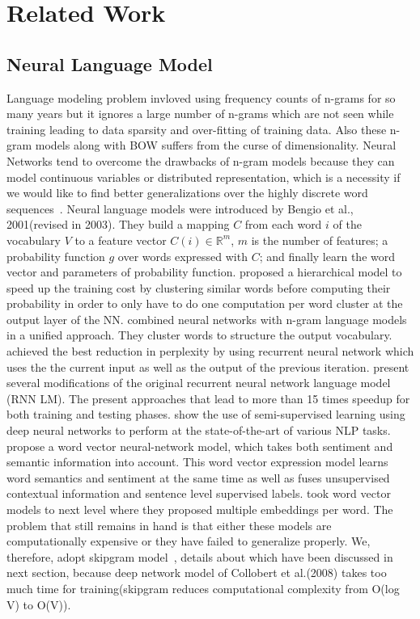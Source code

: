 \documentclass[11pt,a4paper]{article}
\begin{document}
\section{Related Work}
\subsection{Neural Language Model}
Language modeling problem invloved using frequency counts of n-grams for so many years but it ignores a large number of n-grams which are not seen while training leading to data sparsity and over-fitting of training data. Also these n-gram models along with BOW suffers from the curse of dimensionality. Neural Networks tend to overcome the drawbacks of n-gram models because they can model continuous variables or distributed representation, which is a necessity if we would like to find better generalizations over the highly discrete word sequences~\cite{Bengio:03}. 
Neural language models were introduced by Bengio et al., 2001(revised in 2003\cite{Bengio:03}). They build a mapping $C$ from each word $i$ of the vocabulary $V$ to a feature vector $C(i) \in \mathbb{R}^m$, $m$ is the number of features; a probability function $g$ over words expressed with $C$; and finally learn the word vector and parameters of probability function.
\cite{Morin:05} proposed a hierarchical model to speed up the training cost by clustering similar words before computing their probability in order to only have to do one computation per word cluster
at the output layer of the NN.
\cite{Le:11} combined neural networks with n-gram language models in a unified approach. They cluster words to structure the output vocabulary. \cite{Mikolov:10} achieved the best reduction in perplexity by using recurrent neural network which uses the the current input as well as the output of the previous iteration.
\cite{Mikolov:11} present several modifications of the original recurrent neural network language model (RNN LM). The present approaches that lead to more than 15 times speedup for both training and testing phases.
\cite{Collobert:08} show the use of semi-supervised learning using deep neural networks to perform at the state-of-the-art of various NLP tasks. \cite{Wang:14} propose a word vector neural-network model, which takes both sentiment and semantic information into account. This word vector expression model learns word semantics and sentiment at the same time as well as fuses unsupervised contextual information and sentence level supervised labels. \cite{Neelakantan:14} took word vector models to next level where they proposed multiple embeddings per word.
The problem that still remains in hand is that either these models are computationally expensive or they have failed to generalize properly. We, therefore, adopt skipgram model~\cite{Mikolov:13a}, details about which have been discussed in next section, because deep network model of Collobert et al.(2008) takes too much time for training(skipgram reduces computational complexity from O(log V) to O(V)).
\end{document}
